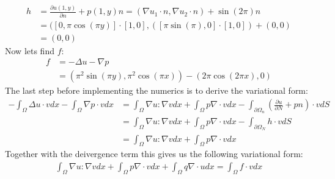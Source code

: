 \documentclass[11pt,a4paper]{report}
\begin{document}
\begin{align*}
h &= \frac{\partial u(1,y)}{\partial n} + p(1,y)n  = (\nabla u_1\cdot n,\nabla u_2\cdot n) +\sin(2\pi)n\\
&= ( [0,\pi \cos(\pi y)] \cdot[1,0], ( [\pi \sin(\pi ),0]\cdot[1,0]) +(0,0) \\
& = (0,0)
\end{align*}
Now lets find $f$:
\begin{align*}
f &= -\Delta u - \nabla p \\
&= (\pi^2 \sin(\pi y),\pi^2 \cos(\pi x)) - (2\pi\cos(2\pi x),0) 
\end{align*} 
The last step before implementing the numerics is to derive the variational form:
\begin{align*}
-\int_{\Omega} \Delta u \cdot v dx - \int_{\Omega} \nabla p \cdot v dx &= \int_{\Omega} \nabla u :\nabla v dx + \int_{\Omega} p \nabla\cdot v dx -\int_{\partial\Omega_n}(\frac{\partial u}{\partial N} + pn)\cdot v dS \\
&=\int_{\Omega} \nabla u :\nabla v dx + \int_{\Omega} p \nabla\cdot v dx -\int_{\partial\Omega_N}h\cdot v dS \\
&=\int_{\Omega} \nabla u :\nabla v dx + \int_{\Omega} p \nabla\cdot v dx
\end{align*}
Together with the deivergence term this gives us the following variational form:
\begin{align*}
\int_{\Omega} \nabla u :\nabla v dx + \int_{\Omega} p \nabla\cdot v dx +\int_{\Omega} q\nabla\cdot u  dx = \int_{\Omega} f\cdot v dx
\end{align*}
\end{document}
